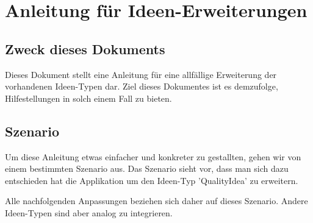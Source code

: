 \section{Anleitung für Ideen-Erweiterungen}
\label{sec:Ideen_Erweiterung}

\subsection{Zweck dieses Dokuments}
Dieses Dokument stellt eine Anleitung für eine allfällige Erweiterung der vorhandenen Ideen-Typen dar. Ziel dieses Dokumentes ist es demzufolge, Hilfestellungen in solch einem Fall zu bieten. 

\subsection{Szenario}
Um diese Anleitung etwas einfacher und konkreter zu gestallten, gehen wir von einem bestimmten Szenario aus. Das Szenario sieht vor, dass man sich dazu entschieden hat die Applikation um den Ideen-Typ 'QualityIdea' zu erweitern.

Alle nachfolgenden Anpassungen beziehen sich daher auf dieses Szenario. Andere Ideen-Typen sind aber analog zu integrieren.

